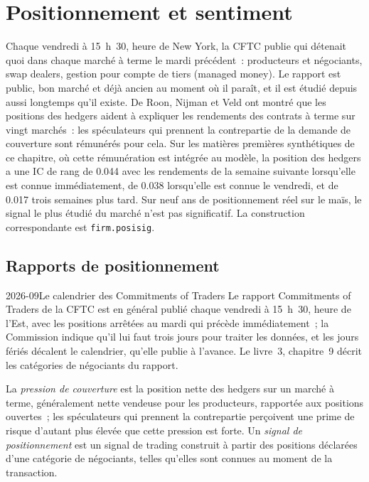 \chapter{Positionnement et sentiment}\label{ch:s1:positioning-and-sentiment}

Chaque vendredi à 15~h~30, heure de New York, la CFTC publie qui détenait quoi dans chaque marché à terme le mardi précédent~: producteurs et négociants, swap dealers, gestion pour compte de tiers (managed money).
Le rapport est public, bon marché et déjà ancien au moment où il paraît, et il est étudié depuis aussi longtemps qu'il existe.
De Roon, Nijman et Veld ont montré que les positions des hedgers aident à expliquer les rendements des contrats à terme sur vingt marchés~: les spéculateurs qui prennent
la contrepartie de la demande de couverture sont rémunérés pour cela. Sur les matières premières synthétiques de ce chapitre, où cette rémunération est intégrée au modèle, la position des hedgers a une IC de rang de 0.044
avec les rendements de la semaine suivante lorsqu'elle est connue immédiatement, de 0.038 lorsqu'elle est connue le vendredi, et de 0.017 trois semaines plus tard. Sur neuf ans de positionnement réel sur le maïs, le signal le plus étudié du marché
n'est pas significatif. La construction correspondante est \texttt{firm.posisig}.

\section{Rapports de positionnement}

\begin{dated}{2026-09}{Le calendrier des Commitments of Traders}\label{dat:s1:positioning-and-sentiment:cot}
Le rapport Commitments of Traders de la CFTC est en général publié chaque vendredi à 15~h~30, heure de l'Est, avec les positions arrêtées au
mardi qui précède immédiatement~; la Commission indique qu'il lui faut trois jours pour traiter les données, et les jours fériés décalent le calendrier, qu'elle publie à l'avance. Le livre~3,
chapitre~9 décrit les catégories de négociants du rapport.
\end{dated}

\begin{definition}\label{def:s1:positioning-and-sentiment:hedging}
La \emph{pression de couverture} est la position nette des hedgers sur un marché à terme, généralement nette vendeuse pour les producteurs, rapportée
aux positions ouvertes~; les spéculateurs qui prennent la contrepartie perçoivent une prime de risque d'autant plus élevée que cette pression est forte. Un \emph{signal de positionnement} est un
signal de trading construit à partir des positions déclarées d'une catégorie de négociants, telles qu'elles sont connues au moment de la transaction.
\end{definition}

